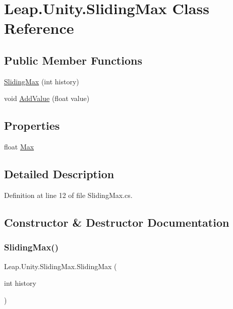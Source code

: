 \hypertarget{class_leap_1_1_unity_1_1_sliding_max}{}\section{Leap.\+Unity.\+Sliding\+Max Class Reference}
\label{class_leap_1_1_unity_1_1_sliding_max}
\subsection*{Public Member Functions}
\begin{DoxyCompactItemize}
\item 
\mbox{\hyperlink{class_leap_1_1_unity_1_1_sliding_max_a739c16a0fb0306123ff5355889e0d3dc}{Sliding\+Max}} (int history)
\item 
void \mbox{\hyperlink{class_leap_1_1_unity_1_1_sliding_max_ad28b8d2d4f9d4f678bfbc83162991763}{Add\+Value}} (float value)
\end{DoxyCompactItemize}
\subsection*{Properties}
\begin{DoxyCompactItemize}
\item 
float \mbox{\hyperlink{class_leap_1_1_unity_1_1_sliding_max_a2c891c2afafcc4fdac884447491292b1}{Max}}
\end{DoxyCompactItemize}


\subsection{Detailed Description}


Definition at line 12 of file Sliding\+Max.\+cs.



\subsection{Constructor \& Destructor Documentation}
\mbox{\label{class_leap_1_1_unity_1_1_sliding_max_a739c16a0fb0306123ff5355889e0d3dc}} 
\subsubsection{\texorpdfstring{SlidingMax()}{SlidingMax()}}
{\footnotesize\ttfamily Leap.\+Unity.\+Sliding\+Max.\+Sliding\+Max (\begin{DoxyParamCaption}\item[{int}]{history }\end{DoxyParamCaption})}



